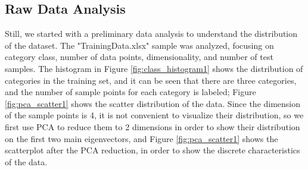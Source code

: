 \documentclass[12pt, onecolumn]{article}
\begin{document}
\subsection{Raw Data Analysis}
Still, we started with a preliminary data analysis to understand the distribution of the dataset. The "TrainingData.xlsx" sample was analyzed, focusing on category class, number of data points, dimensionality, and number of test samples. The histogram in Figure \ref{fig:class_histogram1} shows the distribution of categories in the training set, and it can be seen that there are three categories, and the number of sample points for each category is labeled; Figure \ref{fig:pca_scatter1} shows the scatter distribution of the data. Since the dimension of the sample points is 4, it is not convenient to visualize their distribution, so we first use PCA to reduce them to 2 dimensions in order to show their distribution on the first two main eigenvectors, and Figure \ref{fig:pca_scatter1} shows the scatterplot after the PCA reduction, in order to show the discrete characteristics of the data.
\end{document}
